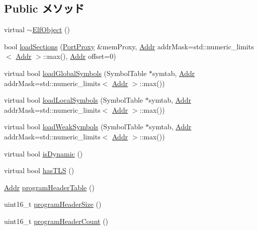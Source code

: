 \subsection*{Public メソッド}
\begin{DoxyCompactItemize}
\item 
virtual \hyperlink{classElfObject_a19af560ae64a3da113d7fac40f776232}{$\sim$ElfObject} ()
\item 
bool \hyperlink{classElfObject_a69ba3469bb66a1ffa5049d581c1faf70}{loadSections} (\hyperlink{classPortProxy}{PortProxy} \&memProxy, \hyperlink{base_2types_8hh_af1bb03d6a4ee096394a6749f0a169232}{Addr} addrMask=std::numeric\_\-limits$<$ \hyperlink{base_2types_8hh_af1bb03d6a4ee096394a6749f0a169232}{Addr} $>$::max(), \hyperlink{base_2types_8hh_af1bb03d6a4ee096394a6749f0a169232}{Addr} offset=0)
\item 
virtual bool \hyperlink{classElfObject_a1de102f86bbb53d20455d9e78be53935}{loadGlobalSymbols} (SymbolTable $\ast$symtab, \hyperlink{base_2types_8hh_af1bb03d6a4ee096394a6749f0a169232}{Addr} addrMask=std::numeric\_\-limits$<$ \hyperlink{base_2types_8hh_af1bb03d6a4ee096394a6749f0a169232}{Addr} $>$::max())
\item 
virtual bool \hyperlink{classElfObject_aab9393b89c15838ac1b842e642f981bb}{loadLocalSymbols} (SymbolTable $\ast$symtab, \hyperlink{base_2types_8hh_af1bb03d6a4ee096394a6749f0a169232}{Addr} addrMask=std::numeric\_\-limits$<$ \hyperlink{base_2types_8hh_af1bb03d6a4ee096394a6749f0a169232}{Addr} $>$::max())
\item 
virtual bool \hyperlink{classElfObject_a4469ce4747735e4ecee3a7d5edafaf54}{loadWeakSymbols} (SymbolTable $\ast$symtab, \hyperlink{base_2types_8hh_af1bb03d6a4ee096394a6749f0a169232}{Addr} addrMask=std::numeric\_\-limits$<$ \hyperlink{base_2types_8hh_af1bb03d6a4ee096394a6749f0a169232}{Addr} $>$::max())
\item 
virtual bool \hyperlink{classElfObject_adeb3f3d68421f3e5f75dbbdf998a21ac}{isDynamic} ()
\item 
virtual bool \hyperlink{classElfObject_a1ed34e505be8c6dabe578012e35a0317}{hasTLS} ()
\item 
\hyperlink{base_2types_8hh_af1bb03d6a4ee096394a6749f0a169232}{Addr} \hyperlink{classElfObject_acccc82a035ebb35744fea52a2b39cad7}{programHeaderTable} ()
\item 
uint16\_\-t \hyperlink{classElfObject_afcbc87834539817b70011c024ab08e95}{programHeaderSize} ()
\item 
uint16\_\-t \hyperlink{classElfObject_ac41b59a59e22c3f13e3b8377965610bb}{programHeaderCount} ()
\end{DoxyCompactItemize}
